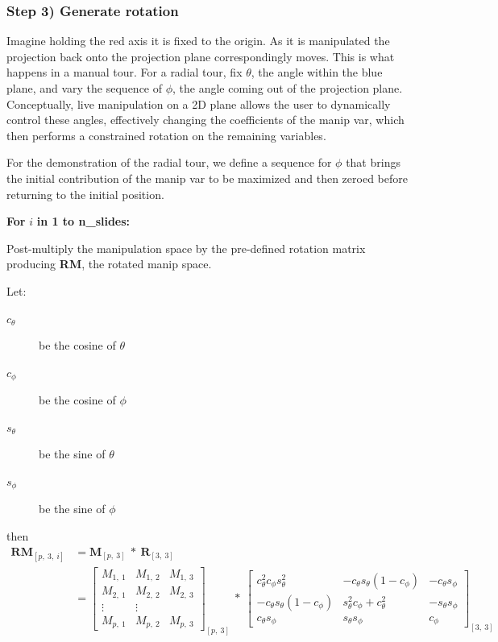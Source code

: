 \hypertarget{step-3-generate-rotation}{%
\subsubsection{Step 3) Generate rotation}\label{step-3-generate-rotation}}

Imagine holding the red axis it is fixed to the origin. As it is manipulated the projection back onto the projection plane correspondingly moves. This is what happens in a manual tour. For a radial tour, fix \(\theta\), the angle within the blue plane, and vary the sequence of \(\phi\), the angle coming out of the projection plane. Conceptually, live manipulation on a 2D plane allows the user to dynamically control these angles, effectively changing the coefficients of the manip var, which then performs a constrained rotation on the remaining variables.

For the demonstration of the radial tour, we define a sequence for \(\phi\) that brings the initial contribution of the manip var to be maximized and then zeroed before returning to the initial position.

\textbf{For } \(i\) \textbf{in 1 to n\_slides:}

Post-multiply the manipulation space by the pre-defined rotation matrix producing \textbf{RM}, the rotated manip space.

Let:

\begin{description}
  \item[$c_\theta$] be the cosine of $\theta$
  \item[$c_\phi$]   be the cosine of $\phi$
  \item[$s_\theta$] be the sine of   $\theta$
  \item[$s_\phi$]   be the sine of   $\phi$
\end{description}

then
\begin{align*}
  \textbf{RM}_{[p,~3,~i]}
  &= \textbf{M}_{[p,~3]} ~*~ \textbf{R}_{[3,~3]} \\
  &= \begin{bmatrix}
    M_{1,~1} & M_{1,~2} & M_{1,~3} \\
    M_{2,~1} & M_{2,~2} & M_{2,~3} \\
    \vdots   & \vdots   \\
    M_{p,~1} & M_{p,~2} & M_{p,~3}
  \end{bmatrix}_{[p,~3]}
    ~*~
  \begin{bmatrix}
    c_\theta^2 c_\phi s_\theta^2 &
    -c_\theta s_\theta (1 - c_\phi) &
    -c_\theta s_\phi \\
    -c_\theta s_\theta (1 - c_\phi) &
    s_\theta^2 c_\phi + c_\theta^2 &
    -s_\theta s_\phi \\
    c_\theta s_\phi &
    s_\theta s_\phi &
    c_\phi
  \end{bmatrix}_{[3,~3]}
\end{align*}

